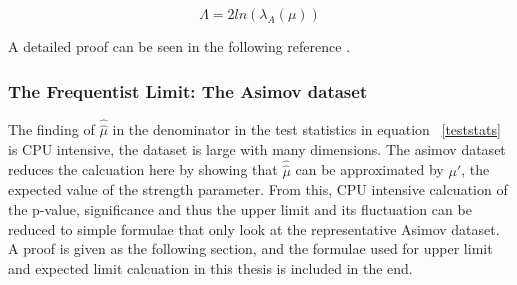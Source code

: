 \begin{equation}
    \Lambda=2ln(\lambda_{A}(\mu))
    \label{eq:Lambda}
\end{equation}

A detailed proof can be seen in the following reference \cite{2011}. 










%
%
%
%





\subsubsection{The Frequentist Limit: The Asimov dataset}
\label{sec:asimov}

The finding of $\hat{\hat{\mu}}$ in the denominator in the test statistics in equation ~\ref{teststats} is CPU intensive, the dataset is large with many dimensions. The asimov dataset reduces the calcuation here by showing that $\hat{\hat{\mu}}$ can be approximated by $\mu'$, the expected value of the strength parameter. From this, CPU intensive calcuation of the p-value, significance and thus the upper limit and its fluctuation can be reduced to simple formulae that only look at the representative Asimov dataset. 
A proof is given as the following section, and the formulae used for upper limit and expected limit calcuation in this thesis is included in the end. 

